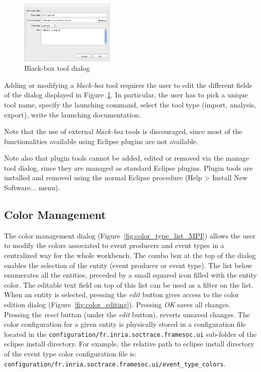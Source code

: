 \documentclass[twoside]{article}
\begin{document}
\begin{sloppypar}
\begin{figure}[h!]
  \centering
    \includegraphics[width=0.4\textwidth]{images/blackbox.png}
  \caption{Black-box tool dialog}
  \label{fig:blackbox}
\end{figure}

Adding or modifying a \emph{black-box} tool requires the user to edit the different fields of the dialog displayed in Figure~\ref{fig:blackbox}.
In particular, the user has to pick a unique tool name, specify the launching command, select the tool type (import, analysis, export), write the launching documentation.

Note that the use of external \emph{black-box} tools is discouraged, since most of the functionalities available using Eclipse plugins are not available.

Note also that plugin tools cannot be added, edited or removed via the manage tool dialog, since they are managed as standard Eclipse plugins.
Plugin tools are installed and removed using the normal Eclipse procedure (Help > Install New Software... menu). 

\subsection{Color Management}
\label{subsec:colors}


The color management dialog (Figure~\ref{fig:color_type_list_MPI}) allows the user to modify the colors associated to event producers and event types in a centralized way for the whole workbench.
The combo box at the top of the dialog enables the selection of the entity (event producer or event type).
The list below enumerates all the entities, preceded by a small squared icon filled with the entity color.
The editable text field on top of this list can be used as a filter on the list.
When an entity is selected, pressing the \emph{edit} button gives access to the color edition dialog (Figure~\ref{fig:color_editing}).
Pressing \emph{OK} saves all changes.
Pressing the \emph{reset} button (under the \emph{edit} button), reverts unsaved changes.
The color configuration for a given entity is physically stored in a configuration file located in the \texttt{configuration/fr.inria.soctrace.framesoc.ui} sub-folder of the eclipse install directory.
For example, the relative path to eclipse install directory of the event type color configuration file is:
\texttt{configuration/fr.inria.soctrace.framesoc.ui/event\_type\_colors}.


\end{sloppypar}
\end{document}
